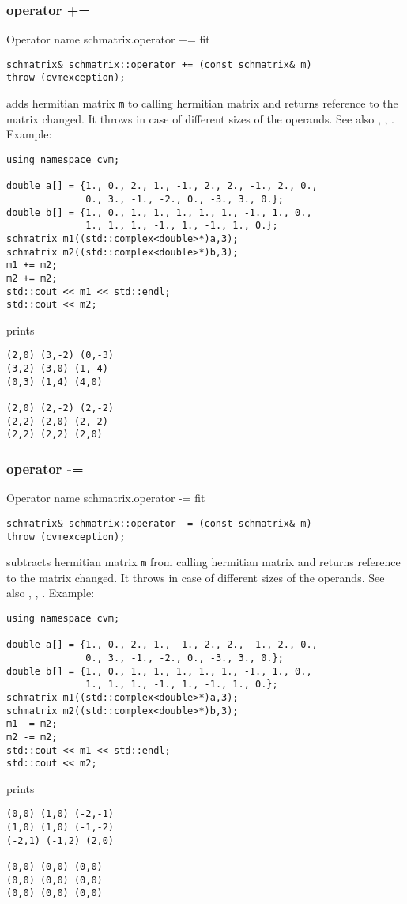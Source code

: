\subsubsection{operator +=}
Operator%
\pdfdest name {schmatrix.operator +=} fit
\begin{verbatim}
schmatrix& schmatrix::operator += (const schmatrix& m) 
throw (cvmexception);
\end{verbatim}
adds  hermitian matrix \verb"m" to  calling hermitian matrix 
and returns  reference to
the matrix changed.
It throws  
in case of different sizes 
of the operands.
See also ,
,
.
Example:
\begin{Verbatim}
using namespace cvm;

double a[] = {1., 0., 2., 1., -1., 2., 2., -1., 2., 0.,
              0., 3., -1., -2., 0., -3., 3., 0.};
double b[] = {1., 0., 1., 1., 1., 1., 1., -1., 1., 0.,
              1., 1., 1., -1., 1., -1., 1., 0.};
schmatrix m1((std::complex<double>*)a,3);
schmatrix m2((std::complex<double>*)b,3);
m1 += m2;
m2 += m2;
std::cout << m1 << std::endl;
std::cout << m2;
\end{Verbatim}
prints
\begin{Verbatim}
(2,0) (3,-2) (0,-3)
(3,2) (3,0) (1,-4)
(0,3) (1,4) (4,0)

(2,0) (2,-2) (2,-2)
(2,2) (2,0) (2,-2)
(2,2) (2,2) (2,0)
\end{Verbatim}
\newpage




\subsubsection{operator -=}
Operator%
\pdfdest name {schmatrix.operator -=} fit
\begin{verbatim}
schmatrix& schmatrix::operator -= (const schmatrix& m) 
throw (cvmexception);
\end{verbatim}
subtracts  hermitian matrix \verb"m" from  calling hermitian matrix
and returns  reference to
the matrix changed.
It throws  
in case of different sizes 
of the operands.
See also ,
,
.
Example:
\begin{Verbatim}
using namespace cvm;

double a[] = {1., 0., 2., 1., -1., 2., 2., -1., 2., 0.,
              0., 3., -1., -2., 0., -3., 3., 0.};
double b[] = {1., 0., 1., 1., 1., 1., 1., -1., 1., 0.,
              1., 1., 1., -1., 1., -1., 1., 0.};
schmatrix m1((std::complex<double>*)a,3);
schmatrix m2((std::complex<double>*)b,3);
m1 -= m2;
m2 -= m2;
std::cout << m1 << std::endl;
std::cout << m2;
\end{Verbatim}
prints
\begin{Verbatim}
(0,0) (1,0) (-2,-1)
(1,0) (1,0) (-1,-2)
(-2,1) (-1,2) (2,0)

(0,0) (0,0) (0,0)
(0,0) (0,0) (0,0)
(0,0) (0,0) (0,0)
\end{Verbatim}
\newpage




